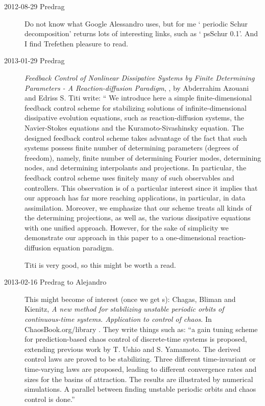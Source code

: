 \begin{description}
\item[2012-08-29  Predrag] Do not know what Google Alessandro uses, but
for me
`
{periodic Schur decomposition}' returns lots of interesting links, such
as `
{psSchur 0.1}'. And I find Trefethen pleasure to read.

\item[2013-01-29  Predrag]
{\em Feedback Control of Nonlinear Dissipative Systems by Finite Determining
  Parameters - A Reaction-diffusion Paradigm},
, by
Abderrahim Azouani and Edriss S. Titi write: ``
  We introduce here a simple finite-dimensional feedback control scheme for
stabilizing solutions of infinite-dimensional dissipative evolution equations,
such as reaction-diffusion systems, the Navier-Stokes equations and the
Kuramoto-Siva\-shin\-sky equation. The designed feedback control scheme takes
advantage of the fact that such systems possess finite number of determining
parameters (degrees of freedom), namely, finite number of determining Fourier
modes, determining nodes, and determining interpolants and projections. In
particular, the feedback control scheme uses finitely many of such observables
and controllers. This observation is of a particular interest since it implies
that our approach has far more reaching applications, in particular, in data
assimilation. Moreover, we emphasize that our scheme treats all kinds of the
determining projections, as well as, the various dissipative equations with one
unified approach. However, for the sake of simplicity we demonstrate our
approach in this paper to a one-dimensional reaction-diffusion equation
paradigm.

Titi is very good, so this might be worth a read.

\item[2013-02-16 Predrag to Alejandro] This might become of interest
    (once we get \po s): Chagas, Bliman and
    Kienitz, \emph{A new method for
    stabilizing unstable periodic orbits of continuous-time systems.
    Application to control of chaos}. In ChaosBook.org/library . They
    write things such as: ``a gain tuning scheme for prediction-based
    chaos control of discrete-time systems is proposed, extending
    previous work by T. Ushio and S. Yamamoto. The derived control laws
    are proved to be stabilizing. Three different time-invariant or
    time-varying laws are proposed, leading to different convergence
    rates and sizes for the basins of attraction. The results are
    illustrated by numerical simulations. A parallel between finding
    unstable periodic orbits and chaos control is done.''


\end{description}
